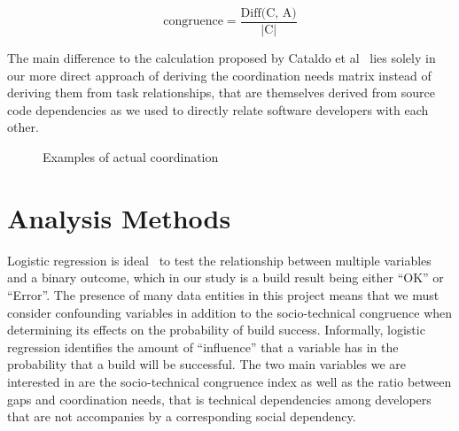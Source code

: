 \[ \text{congruence} = \frac{\text{Diff(C, A)}}  {|\text{C}|} \]

The main difference to the calculation proposed by Cataldo et al~\cite{cataldo:cscw:2006} lies solely in our more direct approach of deriving the coordination needs matrix instead of deriving them from task relationships, that are themselves derived from source code dependencies as we used to directly relate software developers with each other.


\begin{figure}[t]
\centering
{}
\caption{Examples of actual coordination}
\label{ph:relationships}
\end{figure}


\section{Analysis Methods}
\label{sec:methodology}
Logistic regression is ideal~\cite{Sheskin2000} to test the relationship between multiple variables and a binary outcome, which in our study is a build result being either ``OK'' or ``Error''. The presence of many data entities in this project means that we must consider confounding variables in addition to the socio-technical congruence when determining its effects on the probability of build success. Informally, logistic regression identifies the amount of ``influence'' that a variable has in the probability that a build will be successful.
The two main variables we are interested in are the socio-technical congruence index as well as the ratio between gaps and coordination needs, that is technical dependencies among developers that are not accompanies by a corresponding social dependency.

